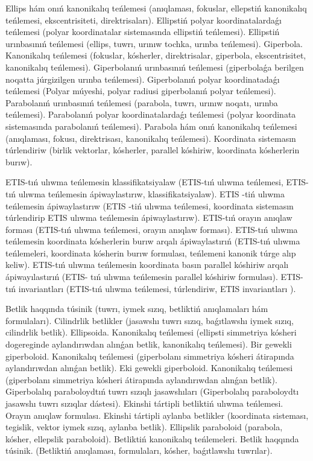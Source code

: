 Ellips hám onıń kanonikalıq teńlemesi (anıqlaması, fokuslar, ellepstiń kanonikalıq teńlemesi, ekscentrisiteti, direktrisaları).
Ellipstiń polyar koordinatalardaǵı teńlemesi (polyar koordinatalar sistemasında ellipstiń teńlemesi).
Ellipstiń urınbasınıń teńlemesi (ellips, tuwrı, urınıw tochka, urınba teńlemesi).
Giperbola. Kanonikalıq teńlemesi (fokuslar, kósherler, direktrisalar, giperbola, ekscentrisitet, kanonikalıq teńlemesi).
Giperbolanıń urınbasınıń teńlemesi (giperbolaǵa berilgen noqatta júrgizilgen urınba teńlemesi).
Giperbolanıń polyar koordinatadaǵı teńlemesi (Polyar múyeshi, polyar radiusi giperbolanıń polyar teńlemesi).
Parabolanıń urınbasınıń teńlemesi (parabola, tuwrı, urınıw noqatı, urınba teńlemesi).
Parabolanıń polyar koordinatalardaǵı teńlemesi (polyar koordinata sistemasında parabolanıń teńlemesi).
Parabola hám onıń kanonikalıq teńlemesi (anıqlaması, fokusı, direktrisası, kanonikalıq teńlemesi).
Koordinata sistemasın túrlendiriw (birlik vektorlar, kósherler, parallel kóshiriw, koordinata kósherlerin burıw).

ETIS-tıń ulıwma teńlemesin klassifikatsiyalaw (ETIS-tıń ulıwma teńlemesi, ETIS-tıń ulıwma teńlemesin ápiwaylastırıw, klassifikatsiyalaw).
ETIS -tiń ulıwma teńlemesin ápiwaylastırıw (ETIS -tiń ulıwma teńlemesi, koordinata sistemasın túrlendirip ETIS ulıwma teńlemesin ápiwaylastırıw).
ETIS-tıń orayın anıqlaw forması (ETIS-tıń ulıwma teńlemesi, orayın anıqlaw forması).
ETIS-tıń ulıwma teńlemesin koordinata kósherlerin burıw arqalı ápiwaylastırıń (ETIS-tıń ulıwma teńlemeleri, koordinata kósherin burıw formulası, teńlemeni kanonik túrge alıp keliw).
ETIS-tıń ulıwma teńlemesin koordinata basın parallel kóshiriw arqalı ápiwayılastırıń (ETIS- tıń ulıwma teńlemesin parallel kóshiriw formulası).
ETIS-tıń invariantları (ETIS-tıń ulıwma teńlemesi, túrlendiriw, ETIS invariantları ).

Betlik haqqında túsinik (tuwrı, iymek sızıq, betliktiń anıqlamaları hám formulaları).
Cilindrlik betlikler (jasawshı tuwrı sızıq, baǵıtlawshı iymek sızıq, cilindrlik betlik).
Ellipsoida. Kanonikalıq teńlemesi (ellipsti simmetriya kósheri dogereginde aylandırıwdan alınǵan betlik, kanonikalıq teńlemesi).
Bir gewekli giperboloid. Kanonikalıq teńlemesi (giperbolanı simmetriya kósheri átirapında aylandırıwdan alınǵan betlik).
Eki gewekli giperboloid. Kanonikalıq teńlemesi (giperbolanı simmetriya kósheri átirapında aylandırıwdan alınǵan betlik).
Giperbolalıq paraboloydtıń tuwrı sızıqlı jasawshıları (Giperbolalıq paraboloydtı jasawshı tuwrı sızıqlar dástesi).
Ekinshi tártipli betliktiń ulıwma teńlemesi. Orayın anıqlaw formulası.
Ekinshi tártipli aylanba betlikler (koordinata sisteması, tegislik, vektor iymek sızıq, aylanba betlik).
Ellipslik paraboloid (parabola, kósher, ellepslik paraboloid).
Betliktiń kanonikalıq teńlemeleri. Betlik haqqında túsinik. (Betliktiń anıqlaması, formulaları, kósher, baǵıtlawshı tuwrılar).
